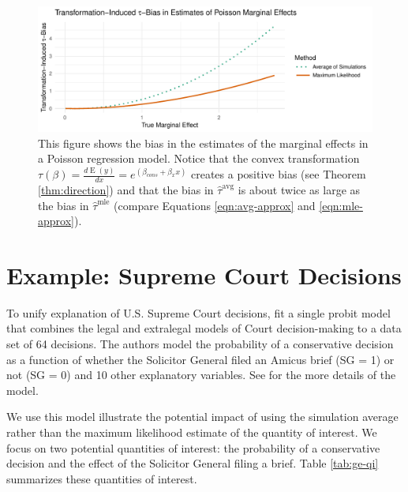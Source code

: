 \documentclass[11pt]{article}
\DeclareMathOperator*{\E}{\text{E}}
\begin{document}
\begin{figure}[h!]
\begin{center}
\includegraphics[scale = 0.65]{figs/poisson-mcs.pdf}
\vspace{.1in}
\caption{This figure shows the bias in the estimates of the marginal effects in a Poisson regression model.
Notice that the convex transformation $\tau(\beta) = \frac{d \E (y)}{dx} = e^{(\beta_{cons} + \beta_x x)}$ creates a positive bias (see Theorem \ref{thm:direction}) and that the bias in $\hat{\tau}^\text{avg}$ is about twice as large as the bias in $\hat{\tau}^\text{mle}$ (compare Equations \ref{eqn:avg-approx} and \ref{eqn:mle-approx}).}\label{fig:poisson-mcs}
\end{center}
\end{figure}

\section*{Example: Supreme Court Decisions}

To unify explanation of U.S. Supreme Court decisions, \cite{GeorgeEpstein1992} fit a single probit model that combines the legal and extralegal models of Court decision-making to a data set of 64 decisions.
The authors model the probability of a conservative decision as a function of whether the Solicitor General filed an Amicus brief (SG = 1) or not (SG = 0) and 10 other explanatory variables.
See \cite{GeorgeEpstein1992} for the more details of the model.

We use this model illustrate the potential impact of using the simulation average rather than the maximum likelihood estimate of the quantity of interest.
We focus on two potential quantities of interest: the probability of a conservative decision and the effect of the Solicitor General filing a brief.
Table \ref{tab:ge-qi} summarizes these quantities of interest.
\end{document}

